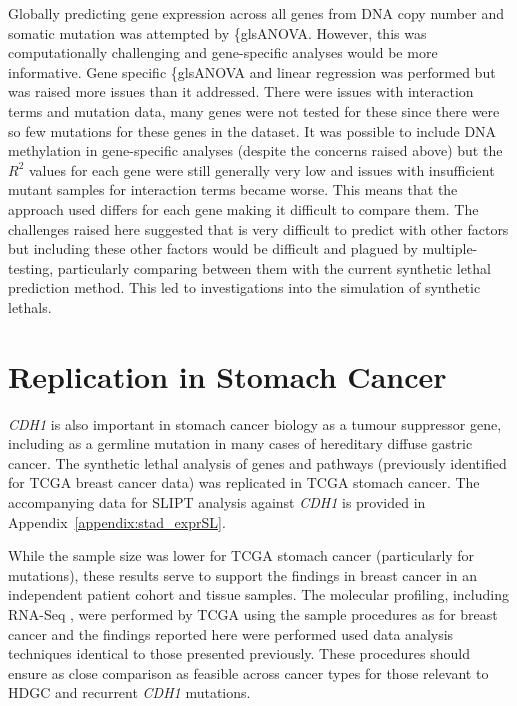 Globally predicting \gls{gene expression} across all genes from \acrshort{DNA} \gls{copy number} and \gls{somatic} \gls{mutation} was attempted by \{gls{ANOVA}. However, this was computationally challenging and gene-specific analyses would be more informative. Gene specific \{gls{ANOVA} and linear regression was performed but was raised more issues than it addressed. There were issues with interaction terms and \gls{mutation} data, many genes were not tested for these since there were so few \glspl{mutation} for these genes in the dataset.  It was possible to include \acrshort{DNA} methylation in gene-specific analyses (despite the concerns raised above) but the $R^2$ values for each gene were still generally very low and issues with insufficient \gls{mutant} samples for interaction terms became worse. This means that the approach used differs for each gene making it difficult to compare them. The challenges raised here suggested that  is very difficult to predict with other factors but including these other factors would be difficult and plagued by multiple-testing, particularly comparing between them with the current \gls{synthetic lethal} prediction method. This led to investigations into the simulation of \glspl{synthetic lethal}.
\fi

\FloatBarrier

\section{Replication in Stomach Cancer} \label{chapt3:stad_replication}

\textit{CDH1} is also important in stomach cancer biology as a  \gls{tumour suppressor} gene, including as a \gls{germline} \gls{mutation} in many cases of \gls{hereditary} diffuse gastric cancer. The \gls{synthetic lethal} analysis of genes and pathways (previously identified for \gls{TCGA} breast cancer data) was replicated in \gls{TCGA} stomach cancer. The accompanying data for \gls{SLIPT} analysis against \textit{CDH1}  is provided in Appendix~\ref{appendix:stad_exprSL}.

While the sample size was lower for \gls{TCGA} stomach cancer (particularly for \glspl{mutation}), these results serve to support the findings in breast cancer in an independent patient cohort and tissue samples. The molecular profiling, including \acrshort{RNA}-Seq , were performed by \gls{TCGA} using the sample procedures as for breast cancer and the findings reported here were performed used data analysis techniques identical to those presented previously. These procedures should ensure as close comparison as feasible across cancer types for those relevant to \gls{HDGC} and recurrent \textit{CDH1} \glspl{mutation}.

